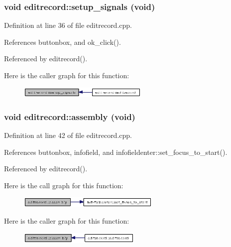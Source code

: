 \subsubsection{\setlength{\rightskip}{0pt plus 5cm}void editrecord::setup\_\-signals (void)\hspace{0.3cm}{\tt  [private]}}\label{classeditrecord_753eba2e913f71ba5106b2463b6e468d}




Definition at line 36 of file editrecord.cpp.

References buttonbox, and ok\_\-click().

Referenced by editrecord().

Here is the caller graph for this function:\begin{figure}[H]
\begin{center}
\leavevmode
\includegraphics[width=176pt]{classeditrecord_753eba2e913f71ba5106b2463b6e468d_icgraph}
\end{center}
\end{figure}
\subsubsection{\setlength{\rightskip}{0pt plus 5cm}void editrecord::assembly (void)\hspace{0.3cm}{\tt  [private]}}\label{classeditrecord_21b3d76e14217b64e280c2b28a3f3175}




Definition at line 42 of file editrecord.cpp.

References buttonbox, infofield, and infofieldenter::set\_\-focus\_\-to\_\-start().

Referenced by editrecord().

Here is the call graph for this function:\begin{figure}[H]
\begin{center}
\leavevmode
\includegraphics[width=193pt]{classeditrecord_21b3d76e14217b64e280c2b28a3f3175_cgraph}
\end{center}
\end{figure}


Here is the caller graph for this function:\begin{figure}[H]
\begin{center}
\leavevmode
\includegraphics[width=166pt]{classeditrecord_21b3d76e14217b64e280c2b28a3f3175_icgraph}
\end{center}
\end{figure}


